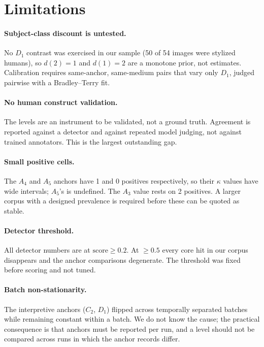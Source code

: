 \documentclass[11pt]{article}
\begin{document}
\section*{Limitations}
\label{sec:limitations}
\paragraph{Subject-class discount is untested.} No $D_1$ contrast was exercised in our sample (50 of 54 images were stylized humans), so $d(2)=1$ and $d(1)=2$ are a monotone prior, not estimates. Calibration requires same-anchor, same-medium pairs that vary only $D_1$, judged pairwise with a Bradley--Terry fit.

\paragraph{No human construct validation.} The levels are an instrument to be validated, not a ground truth. Agreement is reported against a detector and against repeated model judging, not against trained annotators. This is the largest outstanding gap.

\paragraph{Small positive cells.} The $A_4$ and $A_5$ anchors have 1 and 0 positives respectively, so their $\kappa$ values have wide intervals; $A_5$'s is undefined. The $A_3$ value rests on 2 positives. A larger corpus with a designed prevalence is required before these can be quoted as stable.

\paragraph{Detector threshold.} All detector numbers are at $\text{score}\ge0.2$. At $\ge0.5$ every core hit in our corpus disappears and the anchor comparisons degenerate. The threshold was fixed before scoring and not tuned.

\paragraph{Batch non-stationarity.} The interpretive anchors ($C_2$, $D_1$) flipped across temporally separated batches while remaining constant within a batch. We do not know the cause; the practical consequence is that anchors must be reported per run, and a level should not be compared across runs in which the anchor records differ.
\end{document}
